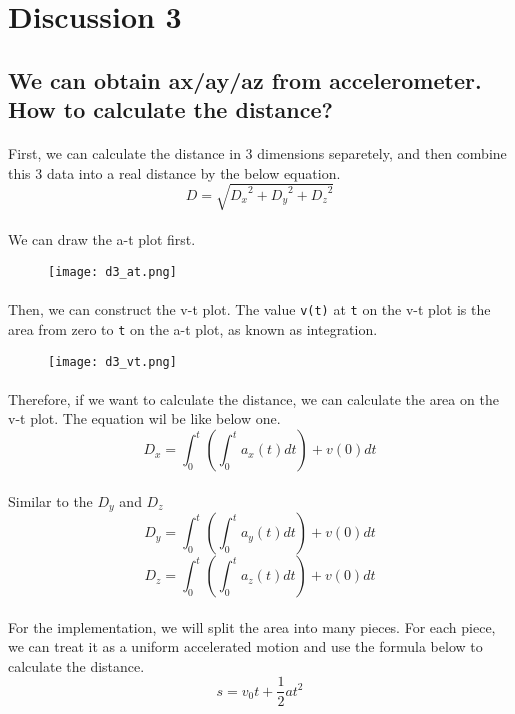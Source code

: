 \section{Discussion 3}
\subsection{We can obtain ax/ay/az from accelerometer. How to calculate the distance?}
\paragraph{}
First, we can calculate the distance in 3 dimensions separetely, and then combine this 3 data into a real distance by the below equation.
$$D = \sqrt{{D_x}^2 + {D_y}^2 + {D_z}^2}$$
\paragraph{}
We can draw the a-t plot first.
\begin{figure}[!h]
    \begin{center} 
        \texttt{[image: d3\_at.png]} 
    \end{center} 
\end{figure}
\paragraph{}
Then, we can construct the v-t plot. The value \texttt{v(t)} at \texttt{t} on the v-t plot is the area from zero to \texttt{t} on the a-t plot, as known as integration.
\begin{figure}[!h]
    \begin{center} 
        \texttt{[image: d3\_vt.png]} 
    \end{center} 
\end{figure}
\paragraph{}
Therefore, if we want to calculate the distance, we can calculate the area on the v-t plot. The equation wil be like below one.
$$D_x = \int_{0}^{t} (\int_{0}^{t} a_x(t) dt) + v(0) dt$$
\paragraph{}
Similar to the $D_y$ and $D_z$
$$D_y = \int_{0}^{t} (\int_{0}^{t} a_y(t) dt) + v(0) dt$$
$$D_z = \int_{0}^{t} (\int_{0}^{t} a_z(t) dt) + v(0) dt$$
\paragraph{}
For the implementation, we will split the area into many pieces. For each piece, we can treat it as a uniform accelerated motion and use the formula below to calculate the distance.
$$s = v_0t + \frac{1}{2}at^2$$
